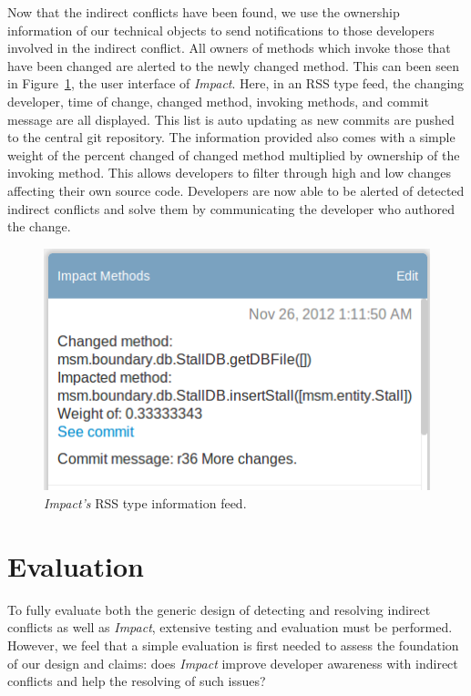 \documentclass[conference]{IEEEtran}
\begin{document}
Now that the indirect conflicts have been found, we use the
ownership information of our technical objects to send notifications to
those developers involved in the indirect conflict. All owners
of methods which invoke those that have been changed are alerted
to the newly changed method. This can been seen in
Figure~\ref{fig:impact}, the user interface of \textit{Impact}. Here, in an RSS type
feed, the changing developer, time of change, changed method,
invoking methods, and commit message are all displayed. This 
list is auto updating as new commits are pushed to the central
git repository. The information provided also comes with a simple
weight of the percent changed of changed method multiplied by 
ownership of the invoking method. This allows developers to filter
through high and low changes affecting their own source code.
Developers are now able to be alerted of detected indirect
conflicts and solve them by communicating the developer
who authored the change.

\begin{figure}[t!]
\includegraphics[width=\columnwidth]{images/ImpactDemo}
\caption{\textit{Impact's} RSS type information feed.\label{fig:impact}}
\end{figure}


\section{Evaluation}
To fully evaluate both the generic design of detecting and resolving
indirect conflicts as well as \textit{Impact}, extensive testing and evaluation
must be performed. However, we feel that a simple evaluation is
first needed to assess the foundation of our design and claims:
does \textit{Impact} improve developer awareness with indirect conflicts
and help the resolving of such issues?
\end{document}

